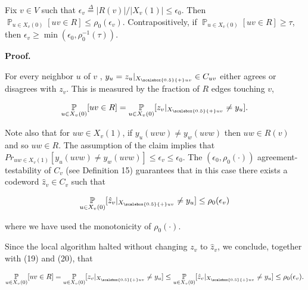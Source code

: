 \documentclass[10pt,a4paper]{article}
\begin{document}
Fix $v\in V$ such that
$\epsilon_{v}\stackrel{{\scriptstyle\Delta}}{{=}}|R(v)|/|X_{v}(1)|\leq\epsilon_{0}$. Then $\operatorname*{\mathbb{P}}_{u\in X_{v}(0)}[uv\in R]\leq\rho_{0}(\epsilon_{v})$.
Contrapositively, if $\operatorname*{\mathbb{P}}_{u\in X_{v}(0)}[uv\in R]\geq\tau$, then $\epsilon_{v}\geq\min(\epsilon_{0},\rho_{0}^{-1}(\tau))$.\par







\par\medskip\noindent\textbf{
\textbf{Proof}.}\par




For every neighbor $u$ of $v$ , $y_{u}=z_{u}|_{{X}_{\scalebox{0.5}{+}uv}}\in C_{uv}$ either agrees or disagrees with $z_{v}$. This is measured by the fraction of $R$ edges touching $v$,\par


\[\begin{gathered}
\operatorname*{\mathbb{P}}_{u\in X_{v}(0)}[uv\in R]=\operatorname*{\mathbb{P}}_{u\in X_{v}(0)}[z_{v}|_{{X}_{\scalebox{0.5}{+}uv}}\neq y_{u}].
\end{gathered}\]


Note also that for $uw\in X_{v}(1)$, if $y_{u}(uvw)\neq y_{w}(uvw)$ then $uw\in R(v)$ and so $uw\in R$. The assumption of the claim implies that $Pr_{uw\in X_{v}(1)}[y_{u}(uvw)\neq y_{w}(uvw)]\leq\epsilon_{v}\leq\epsilon_{0}$.
The $(\epsilon_{0},\rho_{0}(\cdot))$ agreement-testability of $C_{v}$ (see Definition 15) guarantees that in this case there exists a codeword $\hat{z}_{v}\in C_{v}$ such that\par


\[\begin{gathered}
\operatorname*{\mathbb{P}}_{u\in X_{v}(0)}[\hat{z}_{v}|_{{X}_{\scalebox{0.5}{+}uv}}\neq y_{u}]\leq\rho_{0}(\epsilon_{v})
\end{gathered}\]


where we have used the monotonicity of $\rho_{0}(\cdot)$.\par




Since the local algorithm halted without changing $z_{v}$ to $\hat{z}_{v}$, we conclude, together with (19) and (20), that\par


\[\begin{gathered}
\operatorname*{\mathbb{P}}_{u\in X_{v}(0)}[uv\in R]=\operatorname*{\mathbb{P}}_{u\in X_{v}(0)}[z_{v}|_{{X}_{\scalebox{0.5}{+}uv}}\neq y_{u}]\leq\operatorname*{\mathbb{P}}_{u\in X_{v}(0)}[\hat{z}_{v}|_{{X}_{\scalebox{0.5}{+}uv}}\neq y_{u}]\leq\rho_{0}(\epsilon_{v}).
\end{gathered}\]
\end{document}
